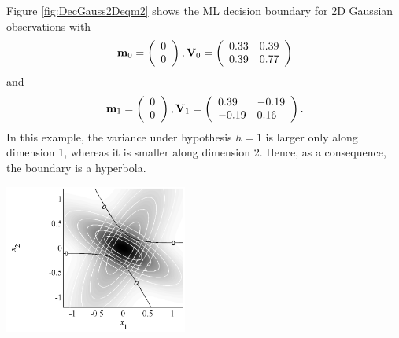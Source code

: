 \begin{example}
	Figure \ref{fig:DecGauss2Deqm2} shows the ML decision boundary for 2D Gaussian observations with
	\begin{equation*}
	{\bf m}_0 =  \left(\begin{array}{l}  0\\0   \end{array}\right), {\bf V}_0 = 
	\left(\begin{array}{ll} 0.33 & 0.39 \\ 0.39 & 0.77  \end{array} \right)
	\end{equation*}
	and
	\begin{equation*}
	{\bf m}_1 = \left(\begin{array}{l}  0\\0  \end{array}\right), {\bf V}_1 = 
	\left(\begin{array}{ll} 0.39 &-0.19 \\ -0.19 & 0.16\end{array} \right).
	\end{equation*}
	In this example, the variance under hypothesis $h=1$ is larger only along dimension 1, whereas it is smaller along dimension 2. Hence, as a consequence, the boundary is a hyperbola.
		\begin{center}
			\includegraphics[width=6cm]{Figures/DecGauss2Deqm2.pdf}
			\label{fig:DecGauss2Deqm2}
		\end{center}
\end{example}

